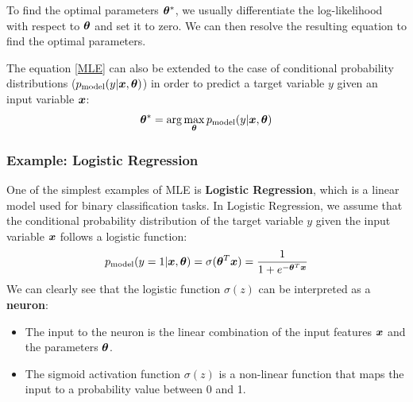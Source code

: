 To find the optimal parameters $\boldsymbol{\theta}^*$, we usually differentiate the log-likelihood with respect to $\boldsymbol{\theta}$ and set it
to zero. We can then resolve the resulting equation to find the optimal parameters.

The equation \ref{MLE} can also be extended to the case of conditional probability distributions ($p_{\text{model}}(y|\boldsymbol{x}, \boldsymbol{\theta})$) in order to predict a target variable $y$ given an input variable $\boldsymbol{x}$:
\begin{equation*}
    \boldsymbol{\theta}^* = \arg\max_{\boldsymbol{\theta}} p_{\text{model}}(y|\boldsymbol{x}, \boldsymbol{\theta})
\end{equation*}

\subsubsection{Example: Logistic Regression}
One of the simplest examples of MLE is \textbf{Logistic Regression}, which is a linear model used for binary classification tasks. 
In Logistic Regression, we assume that the conditional probability distribution of the target variable $y$ given the input variable $\boldsymbol{x}$ follows a logistic function:
\begin{equation}
    \label{Logistic Regression}
    p_{\text{model}}(y=1|\boldsymbol{x}, \boldsymbol{\theta}) = \sigma(\boldsymbol{\theta}^T \boldsymbol{x}) = \frac{1}{1 + e^{-\boldsymbol{\theta}^T \boldsymbol{x}}}
\end{equation}
We can clearly see that the logistic function $\sigma(z)$ can be interpreted as a \textbf{neuron}:
\begin{itemize}
    \item The input to the neuron is the linear combination of the input features $\boldsymbol{x}$ and the parameters $\boldsymbol{\theta}$.
    \item The sigmoid activation function $\sigma(z)$ is a non-linear function that maps the input to a probability value between 0 and 1.
\end{itemize}
